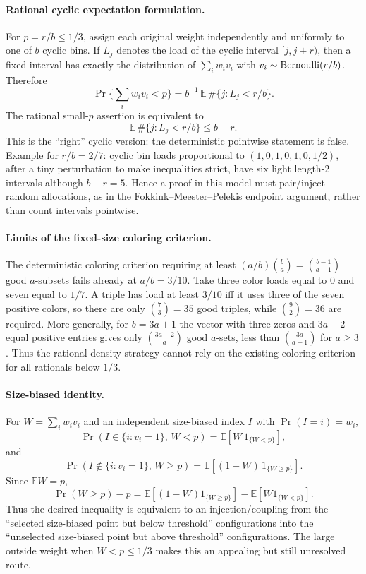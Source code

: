 \documentclass[12pt]{article}
\begin{document}
\paragraph{Rational cyclic expectation formulation.}
For \(p=r/b\le1/3\), assign each original weight independently and uniformly to
one of \(b\) cyclic bins.  If \(L_j\) denotes the load of the cyclic interval
\([j,j+r)\), then a fixed interval has exactly the distribution of
\(\sum_i w_i v_i\) with \(v_i\sim{\rm Bernoulli}(r/b)\).  Therefore
\[
 \Pr\{\sum_i w_i v_i<p\}
 =b^{-1}\,\mathbb E\,\#\{j:L_j<r/b\}.
\]
The rational small-\(p\) assertion is equivalent to
\[
 \mathbb E\,\#\{j:L_j<r/b\}\le b-r .
\]
This is the ``right'' cyclic version: the deterministic pointwise statement is
false.  Example for \(r/b=2/7\): cyclic bin loads proportional to
\((1,0,1,0,1,0,1/2)\), after a tiny perturbation to make inequalities strict,
have six light length-2 intervals although \(b-r=5\).  Hence a proof in this
model must pair/inject random allocations, as in the Fokkink--Meester--Pelekis
endpoint argument, rather than count intervals pointwise.

\paragraph{Limits of the fixed-size coloring criterion.}
The deterministic coloring criterion requiring at least
\((a/b)\binom ba=\binom{b-1}{a-1}\) good \(a\)-subsets fails already at
\(a/b=3/10\).  Take three color loads equal to \(0\) and seven equal to
\(1/7\).  A triple has load at least \(3/10\) iff it uses three of the seven
positive colors, so there are only \(\binom73=35\) good triples, while
\(\binom92=36\) are required.  More generally, for \(b=3a+1\) the vector with
three zeros and \(3a-2\) equal positive entries gives only
\(\binom{3a-2}{a}\) good \(a\)-sets, less than \(\binom{3a}{a-1}\) for
\(a\ge3\).  Thus the rational-density strategy cannot rely on the existing
coloring criterion for all rationals below \(1/3\).

\paragraph{Size-biased identity.}
For \(W=\sum_i w_i v_i\) and an independent size-biased index \(I\) with
\(\Pr(I=i)=w_i\),
\[
\Pr(I\in\{i:v_i=1\},\,W<p)=\mathbb E[W\,1_{\{W<p\}}],
\]
and
\[
\Pr(I\notin\{i:v_i=1\},\,W\ge p)=\mathbb E[(1-W)\,1_{\{W\ge p\}}].
\]
Since \(\mathbb E W=p\),
\[
\Pr(W\ge p)-p
=
\mathbb E[(1-W)1_{\{W\ge p\}}]-\mathbb E[W1_{\{W<p\}}].
\]
Thus the desired inequality is equivalent to an injection/coupling from the
``selected size-biased point but below threshold'' configurations into the
``unselected size-biased point but above threshold'' configurations.  The large
outside weight when \(W<p\le1/3\) makes this an appealing but still unresolved
route.
\end{document}
